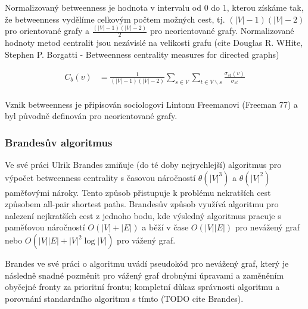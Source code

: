 \documentclass{bakalarka}
\begin{document}
Normalizovaný betweenness je hodnota v intervalu od $0$ do $1$, kterou získáme
tak, že betweenness vydělíme celkovým počtem možných cest, tj. $(|V| - 1)(|V| -
2)$ pro orientované grafy a $\frac{(|V| - 1)(|V| - 2)}{2}$ pro neorientované
grafy. Normalizované hodnoty metod centralit jsou nezávislé na velikosti grafu
(cite Douglas R. WHite, Stephen P. Borgatti - Betweenness centrality measures
for directed graphs)

\begin{align*}
C_b(v) &= \frac{1}{(|V| - 1)(|V| - 2)} \displaystyle\sum\limits_{s \in V} \displaystyle\sum\limits_{t \in V \backslash s} \frac{\sigma_{st}(v)}{\sigma_{st}} \\
\end{align*}

Vznik betweenness je připisován sociologovi Lintonu Freemanovi (Freeman 77) a byl původně definován pro neorientované grafy.

\subsubsection{Brandesův algoritmus}
Ve své práci Ulrik Brandes zmiňuje (do té doby nejrychlejší) algoritmus pro
výpočet betweenness centrality s časovou náročností $\theta(|V|^3)$ a
$\theta(|V|^2)$ paměťovými nároky. Tento způsob přistupuje k problému
nekratších cest způsobem all-pair shortest paths. Brandesův způsob využívá
algoritmu pro nalezení nejkratších cest z jednoho bodu, kde výsledný algoritmus
pracuje s paměťovou náročností $O(|V| + |E|)$ a běží v čase $O(|V||E|)$ pro
nevážený graf nebo $O(|V||E| + |V|^2 \log|V|)$ pro vážený graf. 


Brandes ve své práci o algoritmu uvádí pseudokód pro nevážený graf, který je
následně snadné pozměnit pro vážený graf drobnými úpravami a zaměněním obyčejné
fronty za prioritní frontu; kompletní důkaz správnosti algoritmu a porovnání
standardního algoritmu s tímto (TODO cite Brandes).
\end{document}
